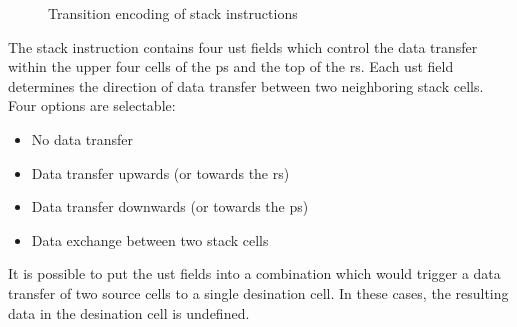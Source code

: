 \begin{figure}[!h]
{{
    }
  }
  \caption{Transition encoding of stack instructions}
  \label{opcodes:stack:transpat}
\end{figure}

The stack instruction contains four \gls{ust} fields which control the data transfer within the upper four
\glspl{cell} of the \gls{ps} and the top of the \gls{rs}. Each \gls{ust} field determines the direction of
data transfer between two neighboring stack \glspl{cell}. Four options are selectable:
\begin{itemize}
  \item No data transfer
  \item Data transfer upwards (or towards the \gls{rs})
  \item Data transfer downwards (or towards the \gls{ps})
  \item Data exchange between two stack \glspl{cell}
\end{itemize}
It is possible to put the \gls{ust} fields into a combination which would trigger a data transfer of two
source \glspl{cell} to a single desination \gls{cell}. In these cases, the resulting data in the desination
\gls{cell} is undefined.

